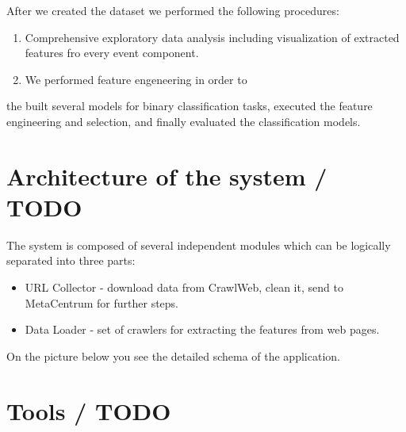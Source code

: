 After we created the dataset we performed the following procedures:
\begin{enumerate}
    \item Comprehensive exploratory data analysis including visualization of extracted features fro every event component.
    \item We performed feature engeneering in order to 
\end{enumerate}

the  built several models for binary classification tasks, executed the feature engineering and selection, and finally evaluated the classification models.    

\section{Architecture of the system / TODO}
\label{sec:arch}

The system is composed of several independent modules which can be logically separated into three parts:

\begin{itemize}
    \item URL Collector - download data from CrawlWeb, clean it, send to MetaCentrum for further steps.
    \item Data Loader - set of crawlers for extracting the features from web pages. 
\end{itemize}
On the picture below you see the detailed schema of the application. 
\section{Tools / TODO}